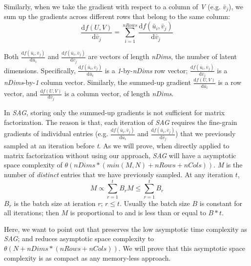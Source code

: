 Similarly, when we take the gradient with respect to a column of \emph{V} (e.g. $\bar{v}_{j}$), we sum up the gradients across different rows that belong to the same column: 
\begin{equation} \label{eq:gradV}
\frac{\text{d}f(U,V)}{\text{d}\bar{v}_j} = \sum_{i=1}^{nRows} \frac{\text{d}f(\bar{u}_i,\bar{v}_j)}{\text{d}\bar{v}_j}
\end{equation}

Both $\frac{\text{d}f(\bar{u}_i,\bar{v}_j)}{\text{d}\bar{u}_i}$ and $\frac{\text{d}f(\bar{u}_i,\bar{v}_j)}{\text{d}\bar{v}_j}$ are vectors of length \emph{nDims}, the number of latent dimensions.
Specifically, $\frac{\text{d}f(\bar{u}_i,\bar{v}_j)}{\text{d}\bar{u}_i}$ is a \emph{1}-by-\emph{nDims} row vector;
$\frac{\text{d}f(\bar{u}_i,\bar{v}_j)}{\text{d}\bar{v}_j}$ is a \emph{nDims}-by-\emph{1} column vector.
Similarly, the summed-up gradient $\frac{\text{d}f(U,V)}{\text{d}\bar{u}_i}$ is a row vector, and $\frac{\text{d}f(U,V)}{\text{d}\bar{v}_j}$ is a column vector, of length \emph{nDims}.

In \emph{SAG}, storing only the summed-up gradients is not sufficient for matrix factorization.
The reason is that, each iteration of \emph{SAG} requires the fine-grain gradients of individual entries 
(e.g. $\frac{\text{d}f(\bar{u}_i,\bar{v}_j)}{\text{d}\bar{u}_i}$ and $\frac{\text{d}f(\bar{u}_i,\bar{v}_j)}{\text{d}\bar{v}_j}$) 
that we previously sampled at an iteration before \emph{t}.  
As we will prove, when directly applied to matrix factorization without using our \tool approach, \emph{SAG} will have a asymptotic space complexity of $\theta(nDims*(min(M,N)+nRows+nCols))$.
\emph{M} is the number of \emph{distinct} entries that we have previously sampled.  At any iteration $t$, 
\begin{equation} \label{eq:msampled}
M \propto \sum_{r=1}^{t} B_r
M \leq \sum_{r=1}^{t} B_r
\end{equation}
$B_r$ is the batch size at ieration $r$; $r \leq t$.
Usually the batch size $B$ is constant for all iterations; then $M$ is proportional to and is less than or equal to $B*t$.

Here, we want to point out that \tool preserves the low asymptotic time complexity as \emph{SAG}; and \tool reduces asymptotic space complexity to $\theta(N+nDims*(nRows+nCols))$. 
We will prove that this asymptotic space complexity is as compact as any memory-less approach.


